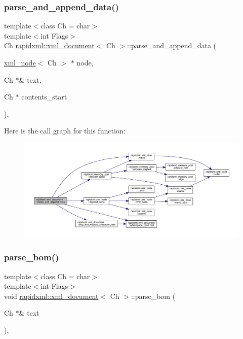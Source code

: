 \subsubsection{\texorpdfstring{parse\_and\_append\_data()}{parse\_and\_append\_data()}}
{\footnotesize\ttfamily template$<$class Ch = char$>$ \\
template$<$int Flags$>$ \\
Ch \mbox{\hyperlink{classrapidxml_1_1xml__document}{rapidxml\+::xml\+\_\+document}}$<$ Ch $>$\+::parse\+\_\+and\+\_\+append\+\_\+data (\begin{DoxyParamCaption}\item[{\mbox{\hyperlink{classrapidxml_1_1xml__node}{xml\+\_\+node}}$<$ Ch $>$ $\ast$}]{node,  }\item[{Ch $\ast$\&}]{text,  }\item[{Ch $\ast$}]{contents\+\_\+start }\end{DoxyParamCaption})\hspace{0.3cm}{\ttfamily [inline]}, {\ttfamily [private]}}

Here is the call graph for this function\+:\nopagebreak
\begin{figure}[H]
\begin{center}
\leavevmode
\includegraphics[width=350pt]{classrapidxml_1_1xml__document_aec6cedf45179b6378c670bc3ea509e61_cgraph}
\end{center}
\end{figure}
\mbox{\label{classrapidxml_1_1xml__document_aaa63a0c7b57ab8fce63d4aebe4da123d}} 
\subsubsection{\texorpdfstring{parse\_bom()}{parse\_bom()}}
{\footnotesize\ttfamily template$<$class Ch = char$>$ \\
template$<$int Flags$>$ \\
void \mbox{\hyperlink{classrapidxml_1_1xml__document}{rapidxml\+::xml\+\_\+document}}$<$ Ch $>$\+::parse\+\_\+bom (\begin{DoxyParamCaption}\item[{Ch $\ast$\&}]{text }\end{DoxyParamCaption})\hspace{0.3cm}{\ttfamily [inline]}, {\ttfamily [private]}}

